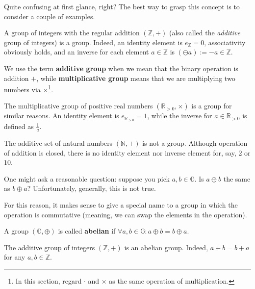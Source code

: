 \documentclass[../lecture-notes.tex]{subfiles}
\begin{document}
Quite confusing at first glance, right? The best way to grasp this concept is to consider a couple of examples.

\begin{example}
    A group of integers with the regular addition $(\mathbb{Z},+)$ (also called the \textit{additive} group of integers) is a group. Indeed, an identity element is $e_{\mathbb{Z}}=0$, associativity obviously holds, and an inverse for each element $a \in \mathbb{Z}$ is $(\ominus a) := -a \in \mathbb{Z}$. 
\end{example}

\begin{remark}
    We use the term \textbf{additive group} when we mean that the binary operation is addition $+$, while \textbf{multiplicative group} means that we are multiplying two numbers via $\times$\footnote{In this section, regard $\cdot$ and $\times$ as the same operation of multiplication.}.
\end{remark}

\begin{example}
    The multiplicative group of positive real numbers $(\mathbb{R}_{> 0}, \times)$ is a group for similar reasons. An identity element is $e_{\mathbb{R}_{>0}} = 1$, while the inverse for $a \in \mathbb{R}_{>0}$ is defined as $\frac{1}{a}$.
\end{example}

\begin{example}
    The additive set of natural numbers $(\mathbb{N}, +)$ is not a group. Although operation of addition is closed, there is no identity element nor inverse element for, say, $2$ or $10$.
\end{example}

One might ask a reasonable question: suppose you pick $a,b \in \mathbb{G}$. Is $a \oplus b$ the same as $b \oplus a$? Unfortunately, generally, this is not true. 

For this reason, it makes sense to give a special name to a group in which the operation is commutative (meaning, we can swap the elements in the operation).

\begin{definition}
    A group $(\mathbb{G},\oplus)$ is called \textbf{abelian} if $\forall a,b \in \mathbb{G}: a \oplus b = b \oplus a$.
\end{definition}

\begin{example}
    The additive group of integers $(\mathbb{Z},+)$ is an abelian group. Indeed, $a + b = b + a$ for any $a,b \in \mathbb{Z}$.
\end{example}
\end{document}
